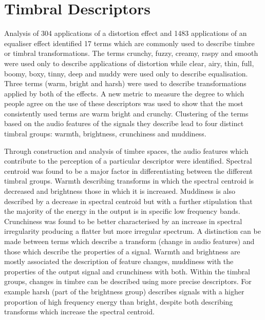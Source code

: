 \section{Timbral Descriptors}
\label{sec:Conclusion-Descriptors}
	Analysis of 304 applications of a distortion effect and 1483 applications of an equaliser effect identified 17 terms
	which are commonly used to describe timbre or timbral transformations. The terms crunchy, fuzzy, creamy, raspy and
	smooth were used only to describe applications of distortion while clear, airy, thin, full, boomy, boxy, tinny, deep
	and muddy were used only to describe equalisation. Three terms (warm, bright and harsh) were used to describe
	transformations applied by both of the effects. A new metric to measure the degree to which people agree on the use
	of these descriptors was used to show that the most consistently used terms are warm bright and crunchy. Clustering
	of the terms based on the audio features of the signals they describe lead to four distinct timbral groups:
	warmth, brightness, crunchiness and muddiness. 

	Through construction and analysis of timbre spaces, the audio features which contribute to the perception of a
	particular descriptor were identified. Spectral centroid was found to be a major factor in differentiating between
	the different timbral groups. Warmth describing transforms in which the spectral centroid is decreased and
	brightness those in which it is increased. Muddiness is also described by a decrease in spectral centroid but with a
	further stipulation that the majority of the energy in the output is in specific low frequency bands. Crunchiness
	was found to be better characterised by an increase in spectral irregularity producing a flatter but more irregular
	spectrum. A distinction can be made between terms which describe a transform (change in audio features) and those
	which describe the properties of a signal. Warmth and brightness are mostly associated the description of feature
	changes, muddiness with the properties of the output signal and crunchiness with both. Within the timbral groups,
	changes in timbre can be described using more precise descriptors. For example harsh (part of the brightness group)
	describes signals with a higher proportion of high frequency energy than bright, despite both describing transforms
	which increase the spectral centroid.


